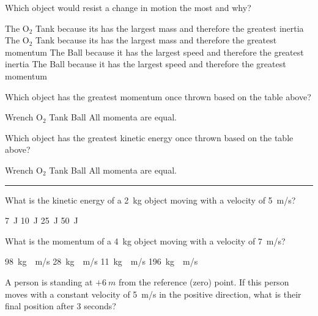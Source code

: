 \documentclass[]{exam}
\begin{document}
\begin{questions}
\clearpage
\question \label{Q14}
Which object would resist a change in motion the most and why?

\begin{randomizechoices}[norandomize]
    \correctchoice The $\mathrm{O}_2$ Tank because its has the largest mass and therefore the greatest inertia
    \choice The $\mathrm{O}_2$ Tank because its has the largest mass and therefore the greatest momentum
    \choice The Ball because it has the largest speed and therefore the greatest inertia
    \choice The Ball because it has the largest speed and therefore the greatest momentum
\end{randomizechoices}

\question 
Which object has the greatest momentum once thrown based on the table above?

\begin{randomizechoices}[norandomize]
    \choice Wrench
    \choice $\mathrm{O}_2$ Tank
    \choice Ball
    \correctchoice All momenta are equal.
\end{randomizechoices}

\question \label{Q16}
Which object has the greatest kinetic energy once thrown based on the table above?

\begin{randomizechoices}[norandomize]
    \choice Wrench
    \choice $\mathrm{O}_2$ Tank
    \correctchoice Ball
    \choice All momenta are equal.
\end{randomizechoices}

\bigskip
\hrule


\question 
What is the kinetic energy of a \SI{2}{kg} object moving with a velocity of \SI{5}{m/s}?

\begin{randomizechoices}[norandomize]
    \choice \SI{7}{J}
    \choice \SI{10}{J}
    \correctchoice \SI{25}{J}
    \choice \SI{50}{J}
\end{randomizechoices}

\question
What is the momentum of a \SI{4}{kg} object moving with a velocity of \SI{7}{m/s}?

\begin{randomizechoices}[norandomize]
    \choice \SI{98}{kg\cdot m/s}
    \correctchoice \SI{28}{kg\cdot m/s}
    \choice \SI{11}{kg\cdot m/s}
    \choice \SI{196}{kg\cdot m/s}
\end{randomizechoices}

\question 
A person is standing at $+\SI{6}{m}$ from the reference (zero) point. If this person moves with a constant velocity of \SI{5}{m/s} in the positive direction, what is their final position after 3 seconds?


\end{questions}
\end{document}
